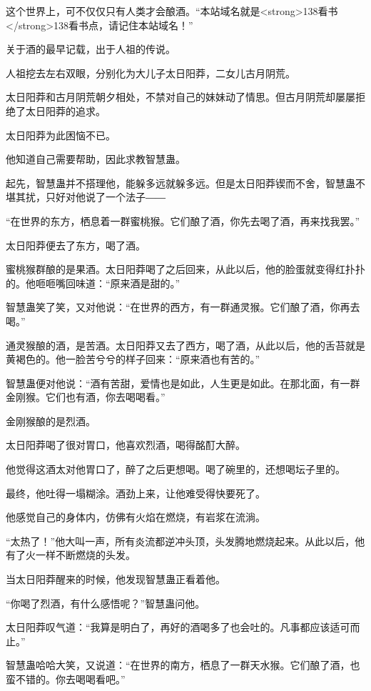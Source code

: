
\begin{this_body}

这个世界上，可不仅仅只有人类才会酿酒。“本站域名就是<strong>138看书</strong>138看书点，请记住本站域名！”

关于酒的最早记载，出于人祖的传说。

人祖挖去左右双眼，分别化为大儿子太日阳莽，二女儿古月阴荒。

太日阳莽和古月阴荒朝夕相处，不禁对自己的妹妹动了情思。但古月阴荒却屡屡拒绝了太日阳莽的追求。

太日阳莽为此困恼不已。

他知道自己需要帮助，因此求教智慧蛊。

起先，智慧蛊并不搭理他，能躲多远就躲多远。但是太日阳莽锲而不舍，智慧蛊不堪其扰，只好对他说了一个法子――

“在世界的东方，栖息着一群蜜桃猴。它们酿了酒，你先去喝了酒，再来找我罢。”

太日阳莽便去了东方，喝了酒。

蜜桃猴群酿的是果酒。太日阳莽喝了之后回来，从此以后，他的脸蛋就变得红扑扑的。他咂咂嘴回味道：“原来酒是甜的。”

智慧蛊笑了笑，又对他说：“在世界的西方，有一群通灵猴。它们酿了酒，你再去喝。”

通灵猴酿的酒，是苦酒。太日阳莽又去了西方，喝了酒，从此以后，他的舌苔就是黄褐色的。他一脸苦兮兮的样子回来：“原来酒也有苦的。”

智慧蛊便对他说：“酒有苦甜，爱情也是如此，人生更是如此。在那北面，有一群金刚猴。它们也有酒，你去喝喝看。”

金刚猴酿的是烈酒。

太日阳莽喝了很对胃口，他喜欢烈酒，喝得酩酊大醉。

他觉得这酒太对他胃口了，醉了之后更想喝。喝了碗里的，还想喝坛子里的。

最终，他吐得一塌糊涂。酒劲上来，让他难受得快要死了。

他感觉自己的身体内，仿佛有火焰在燃烧，有岩浆在流淌。

“太热了！”他大叫一声，所有炎流都逆冲头顶，头发腾地燃烧起来。从此以后，他有了火一样不断燃烧的头发。

当太日阳莽醒来的时候，他发现智慧蛊正看着他。

“你喝了烈酒，有什么感悟呢？”智慧蛊问他。

太日阳莽叹气道：“我算是明白了，再好的酒喝多了也会吐的。凡事都应该适可而止。”

智慧蛊哈哈大笑，又说道：“在世界的南方，栖息了一群天水猴。它们酿了酒，也蛮不错的。你去喝喝看吧。”


\end{this_body}
